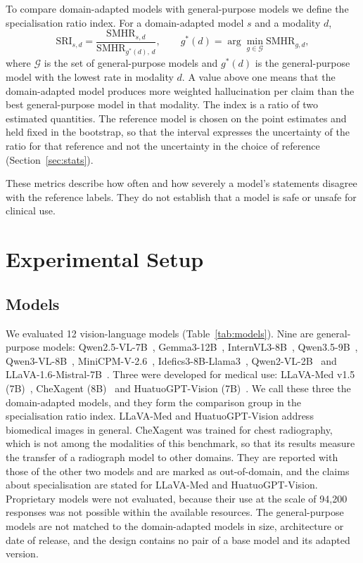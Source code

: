 \documentclass[11pt,a4paper]{article}
\providecommand{\Nmodels}{12}
\providecommand{\Nresponses}{94{,}200}
\newcommand{\SMHR}{\ensuremath{\mathrm{SMHR}}}
\newcommand{\SRI}{\ensuremath{\mathrm{SRI}}}
\begin{document}
To compare domain-adapted models with general-purpose models we define the specialisation ratio index. For a domain-adapted model $s$ and a modality $d$,
\begin{equation}
  \SRI_{s,d} = \frac{\SMHR_{s,d}}{\SMHR_{g^\ast(d),\,d}}, \qquad g^\ast(d)=\arg\min_{g\in\mathcal{G}} \SMHR_{g,d},
\end{equation}
where $\mathcal{G}$ is the set of general-purpose models and $g^\ast(d)$ is the general-purpose model with the lowest rate in modality $d$. A value above one means that the domain-adapted model produces more weighted hallucination per claim than the best general-purpose model in that modality. The index is a ratio of two estimated quantities. The reference model is chosen on the point estimates and held fixed in the bootstrap, so that the interval expresses the uncertainty of the ratio for that reference and not the uncertainty in the choice of reference (Section~\ref{sec:stats}).

These metrics describe how often and how severely a model's statements disagree with the reference labels. They do not establish that a model is safe or unsafe for clinical use.
\section{Experimental Setup}\label{sec:setup}

\subsection{Models}\label{sec:models}
We evaluated \Nmodels{} vision-language models (Table~\ref{tab:models}). Nine are general-purpose models: Qwen2.5-VL-7B~\citep{bai2025qwen25vl}, Gemma3-12B~\citep{gemma2025gemma3}, InternVL3-8B~\citep{zhu2025internvl3}, Qwen3.5-9B~\citep{qwen2026qwen35}, Qwen3-VL-8B~\citep{bai2025qwen3vl}, MiniCPM-V-2.6~\citep{yao2024minicpmv}, Idefics3-8B-Llama3~\citep{laurencon2024idefics3}, Qwen2-VL-2B~\citep{wang2024qwen2vl} and LLaVA-1.6-Mistral-7B~\citep{liu2024llavanext}. Three were developed for medical use: LLaVA-Med v1.5 (7B)~\citep{li2023llavamed}, CheXagent (8B)~\citep{chen2024chexagent} and HuatuoGPT-Vision (7B)~\citep{chen2024huatuogptvision}. We call these three the domain-adapted models, and they form the comparison group in the specialisation ratio index. LLaVA-Med and HuatuoGPT-Vision address biomedical images in general. CheXagent was trained for chest radiography, which is not among the modalities of this benchmark, so that its results measure the transfer of a radiograph model to other domains. They are reported with those of the other two models and are marked as out-of-domain, and the claims about specialisation are stated for LLaVA-Med and HuatuoGPT-Vision. Proprietary models were not evaluated, because their use at the scale of \Nresponses{} responses was not possible within the available resources. The general-purpose models are not matched to the domain-adapted models in size, architecture or date of release, and the design contains no pair of a base model and its adapted version.
\end{document}
